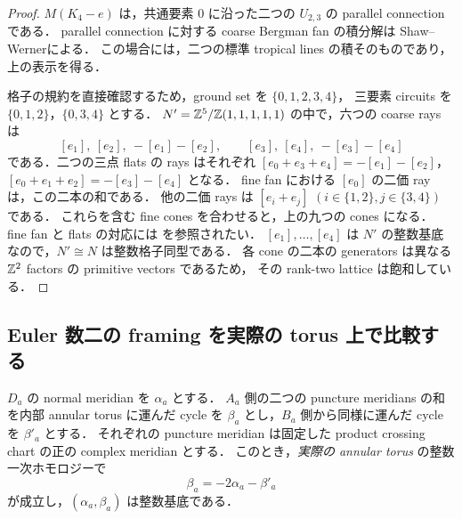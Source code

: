 \begin{proof}
$M(K_4-e)$ は，共通要素 $0$ に沿った二つの $U_{2,3}$ の parallel connection である．
parallel connection に対する coarse Bergman fan の積分解は
Shaw--Werner\cite[Theorem 7.2]{ShawWerner}による．
この場合には，二つの標準 tropical lines の積そのものであり，上の表示を得る．

格子の規約を直接確認するため，ground set を $\{0,1,2,3,4\}$，
三要素 circuits を $\{0,1,2\}$，$\{0,3,4\}$ とする．
$N'=\mathbb Z^5/\mathbb Z(1,1,1,1,1)$ の中で，六つの coarse rays は
\[
 [e_1],\ [e_2],\ -[e_1]-[e_2],\qquad
 [e_3],\ [e_4],\ -[e_3]-[e_4]
\]
である．二つの三点 flats の rays はそれぞれ
$[e_0+e_3+e_4]=-[e_1]-[e_2]$，
$[e_0+e_1+e_2]=-[e_3]-[e_4]$ となる．
fine fan における $[e_0]$ の二価 ray は，この二本の和である．
他の二価 rays は $[e_i+e_j]$ $(i\in\{1,2\},j\in\{3,4\})$ である．
これらを含む fine cones を合わせると，上の九つの cones になる．
fine fan と flats の対応には \cite{FeichtnerSturmfels,ArdilaKlivans} を参照されたい．
$[e_1],\ldots,[e_4]$ は $N'$ の整数基底なので，$N'\cong N$ は整数格子同型である．
各 cone の二本の generators は異なる $\mathbb Z^2$ factors の primitive vectors であるため，
その rank-two lattice は飽和している．
\end{proof}

\subsection{Euler 数二の framing を実際の torus 上で比較する}

\begin{lemma}\label{quad:framing}
$D_a$ の normal meridian を $\alpha_a$ とする．
$A_a$ 側の二つの puncture meridians の和を内部 annular torus に運んだ cycle を
$\beta_a$ とし，$B_a$ 側から同様に運んだ cycle を $\beta'_a$ とする．
それぞれの puncture meridian は固定した product crossing chart の正の complex meridian とする．
このとき，\emph{実際の annular torus} の整数一次ホモロジーで
\begin{equation}\label{quad:actual-framing}
 \beta_a=-2\alpha_a-\beta'_a
\end{equation}
が成立し，$(\alpha_a,\beta_a)$ は整数基底である．
\end{lemma}

